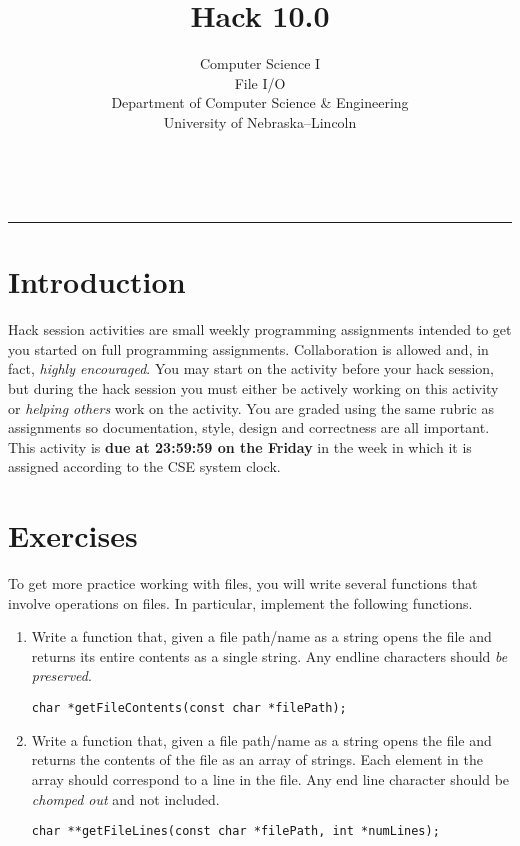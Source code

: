 \documentclass[12pt]{scrartcl}
\title{Hack 10.0}\let\Title\@title
\subtitle{Computer Science I\\
File I/O\\
{\small
\vskip1cm
Department of Computer Science \& Engineering \\
University of Nebraska--Lincoln}
\vskip-2cm}
\date{~}
\begin{document}
\maketitle

\hrule

\section*{Introduction}

Hack session activities are small weekly programming assignments intended
to get you started on full programming assignments.  Collaboration is allowed
and, in fact, \emph{highly encouraged}.  You may start on the activity before
your hack session, but during the hack session you must either be actively 
working on this activity or \emph{helping others} work on the activity.
You are graded using the same rubric as assignments so documentation, style, 
design and correctness are all important.  This activity is \textbf{due 
at 23:59:59 on the Friday} in the week in which it is assigned according 
to the CSE system clock.

\section*{Exercises}

To get more practice working with files, you will write several 
functions that involve operations on files.  In particular, implement
the following functions.

\begin{enumerate}

  \item Write a function that, given a file path/name as a string opens
  the file and returns its entire contents as a single string.  Any endline
  characters should \emph{be preserved}.
  
  \texttt{char *getFileContents(const char *filePath);}

  \item Write a function that, given a file path/name as a string opens
  the file and returns the contents of the file as an array of strings.
  Each element in the array should correspond to a line in the file.
  Any end line character should be \emph{chomped out} and not included.

  \texttt{char **getFileLines(const char *filePath, int *numLines);}

\end{enumerate}
\end{document}
